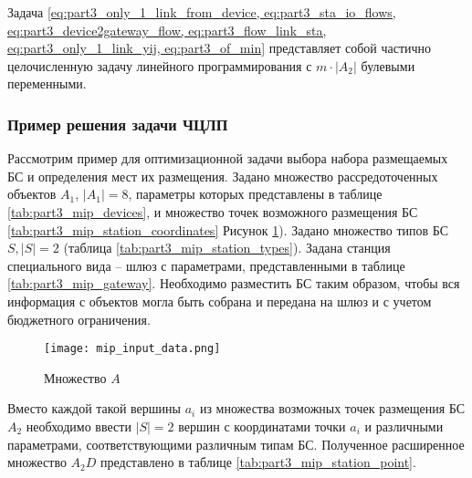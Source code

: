 Задача \cref{eq:part3_only_1_link_from_device, eq:part3_sta_io_flows, eq:part3_device2gateway_flow, eq:part3_flow_link_sta, eq:part3_only_1_link_yij, eq:part3_of_min} представляет собой частично целочисленную задачу линейного программирования с $m \cdot |A_2|$ булевыми переменными. 

\subsubsection{Пример решения задачи ЧЦЛП}

Рассмотрим пример для оптимизационной задачи выбора набора размещаемых БС и определения мест их размещения.
Задано множество рассредоточенных объектов $A_1$, $|A_1| = 8$, параметры которых представлены в таблице \cref{tab:part3_mip_devices}, и множество точек возможного размещения БС \cref{tab:part3_mip_station_coordinates} Рисунок \cref{fig:part3_mip_input_data}). 
Задано множество типов БС $S, |S| = 2$ (таблица \cref{tab:part3_mip_station_types}). 
Задана станция специального вида -- шлюз с параметрами, представленными в таблице  \cref{tab:part3_mip_gateway}. Необходимо разместить БС таким образом, чтобы вся информация с объектов могла быть собрана и  передана на шлюз и с учетом бюджетного ограничения. 

\begin{figure}[h!]
    \centering
     \texttt{[image: mip\_input\_data.png]}
  \caption{Множество $A$}
  \label{fig:part3_mip_input_data}
\end{figure}



Вместо каждой такой вершины $a_i$ из множества возможных точек размещения БС $A_2$ необходимо ввести $|S| =2 $ вершин с координатами точки $a_i$ и различными параметрами, соответствующими различным типам БС. Полученное расширенное множество $A_2D$ представлено в таблице \cref{tab:part3_mip_station_point}.


